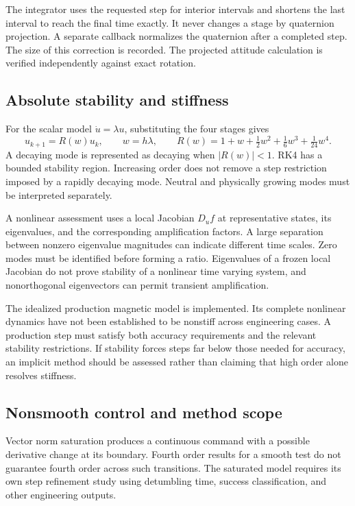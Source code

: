 The integrator uses the requested step for interior intervals and shortens the last interval to reach the final time exactly. It never changes a stage by quaternion projection. A separate callback normalizes the quaternion after a completed step. The size of this correction is recorded. The projected attitude calculation is verified independently against exact rotation.

\subsection{Absolute stability and stiffness}
For the scalar model \(\dot u=\lambda u\), substituting the four stages gives
\[
u_{k+1}=R(w)u_k,\qquad
w=h\lambda,\qquad
R(w)=1+w+\tfrac12w^2+\tfrac16w^3+\tfrac1{24}w^4.
\]
A decaying mode is represented as decaying when \(|R(w)|<1\). RK4 has a bounded stability region. Increasing order does not remove a step restriction imposed by a rapidly decaying mode. Neutral and physically growing modes must be interpreted separately.

A nonlinear assessment uses a local Jacobian \(D_uf\) at representative states, its eigenvalues, and the corresponding amplification factors. A large separation between nonzero eigenvalue magnitudes can indicate different time scales. Zero modes must be identified before forming a ratio. Eigenvalues of a frozen local Jacobian do not prove stability of a nonlinear time varying system, and nonorthogonal eigenvectors can permit transient amplification.

The idealized production magnetic model is implemented. Its complete nonlinear dynamics have not been established to be nonstiff across engineering cases. A production step must satisfy both accuracy requirements and the relevant stability restrictions. If stability forces steps far below those needed for accuracy, an implicit method should be assessed rather than claiming that high order alone resolves stiffness.

\subsection{Nonsmooth control and method scope}
Vector norm saturation produces a continuous command with a possible derivative change at its boundary. Fourth order results for a smooth test do not guarantee fourth order across such transitions. The saturated model requires its own step refinement study using detumbling time, success classification, and other engineering outputs.

